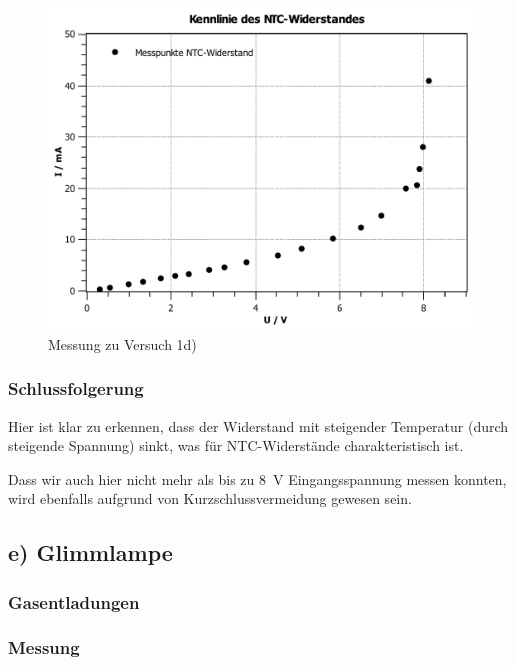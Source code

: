 \documentclass[11pt,a4paper,titlepage, ngerman]{article}
\begin{document}
				\begin{figure}
					\centering
					\includegraphics[width=\textwidth]{KennlinieNTCsubgitter.pdf}
					\caption{Messung zu Versuch 1d)}
					\label{KL d}
				\end{figure}
			
			\subsubsection{Schlussfolgerung}
			
				Hier ist klar zu erkennen, dass der Widerstand mit steigender Temperatur (durch steigende Spannung) sinkt, was für NTC-Widerstände charakteristisch ist. 
				
				Dass wir auch hier nicht mehr als bis zu \SI{8}{\V} Eingangsspannung messen konnten, wird ebenfalls aufgrund von Kurzschlussvermeidung gewesen sein.
			
		\subsection{e) Glimmlampe} %
			
			\subsubsection{Gasentladungen}
			
					
			\subsubsection{Messung}
			
\end{document}
